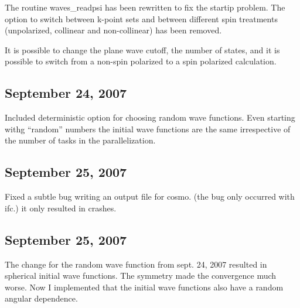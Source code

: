 \documentclass[final,12pt]{article}
\begin{document}
The routine waves\_readpsi has been rewritten to fix the startip
problem.  The option to switch between k-point sets and between
different spin treatments (unpolarized, collinear and non-collinear)
has been removed.

It is possible to change the plane wave cutoff, the number of states,
and it is possible to switch from a non-spin polarized to a spin
polarized calculation.

\subsection{September 24,  2007}

Included deterministic option for choosing random wave functions.
Even starting withg ``random'' numbers the initial wave functions are
the same irrespective of the number of tasks in the parallelization.

\subsection{September 25,  2007}

Fixed a subtle bug writing an output file for cosmo. (the bug only occurred with ifc.)
it only resulted in crashes.

\subsection{September 25,  2007}

The change for the random wave function from sept. 24, 2007 resulted
in spherical initial wave functions. The symmetry made the convergence
much worse. Now I implemented that the initial wave functions also have a
random angular dependence.

\newpage


\end{document}
